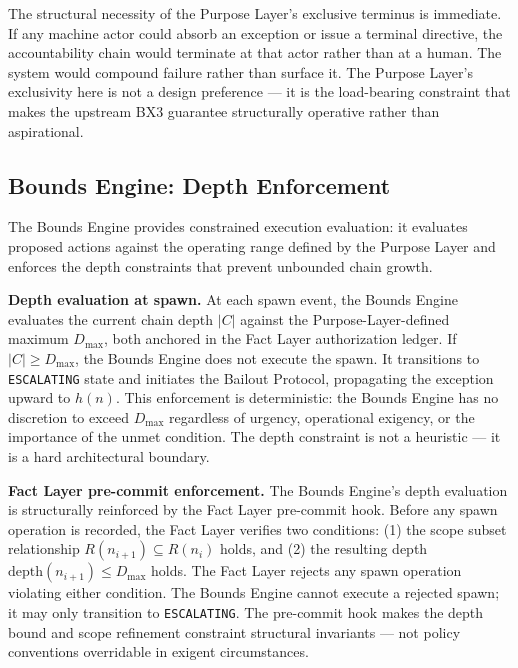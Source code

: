 The structural necessity of the Purpose Layer's exclusive terminus is immediate. If any machine actor could absorb an exception or issue a terminal directive, the accountability chain would terminate at that actor rather than at a human. The system would compound failure rather than surface it. The Purpose Layer's exclusivity here is not a design preference — it is the load-bearing constraint that makes the upstream BX3 guarantee structurally operative rather than aspirational.

\subsection{Bounds Engine: Depth Enforcement}
\label{sec:rs-bounds-depth}

The Bounds Engine provides constrained execution evaluation: it evaluates proposed actions against the operating range defined by the Purpose Layer and enforces the depth constraints that prevent unbounded chain growth.

\medskip
\noindent\textbf{Depth evaluation at spawn.}
At each spawn event, the Bounds Engine evaluates the current chain depth $|C|$ against the Purpose-Layer-defined maximum $D_{\mathrm{max}}$, both anchored in the Fact Layer authorization ledger. If $|C| \geq D_{\mathrm{max}}$, the Bounds Engine does not execute the spawn. It transitions to \texttt{ESCALATING} state and initiates the Bailout Protocol, propagating the exception upward to $h(n)$. This enforcement is deterministic: the Bounds Engine has no discretion to exceed $D_{\mathrm{max}}$ regardless of urgency, operational exigency, or the importance of the unmet condition. The depth constraint is not a heuristic — it is a hard architectural boundary.

\medskip
\noindent\textbf{Fact Layer pre-commit enforcement.}
The Bounds Engine's depth evaluation is structurally reinforced by the Fact Layer pre-commit hook. Before any spawn operation is recorded, the Fact Layer verifies two conditions: (1) the scope subset relationship $R(n_{i+1}) \subseteq R(n_i)$ holds, and (2) the resulting depth $\mathrm{depth}(n_{i+1}) \leq D_{\mathrm{max}}$ holds. The Fact Layer rejects any spawn operation violating either condition. The Bounds Engine cannot execute a rejected spawn; it may only transition to \texttt{ESCALATING}. The pre-commit hook makes the depth bound and scope refinement constraint structural invariants — not policy conventions overridable in exigent circumstances.

